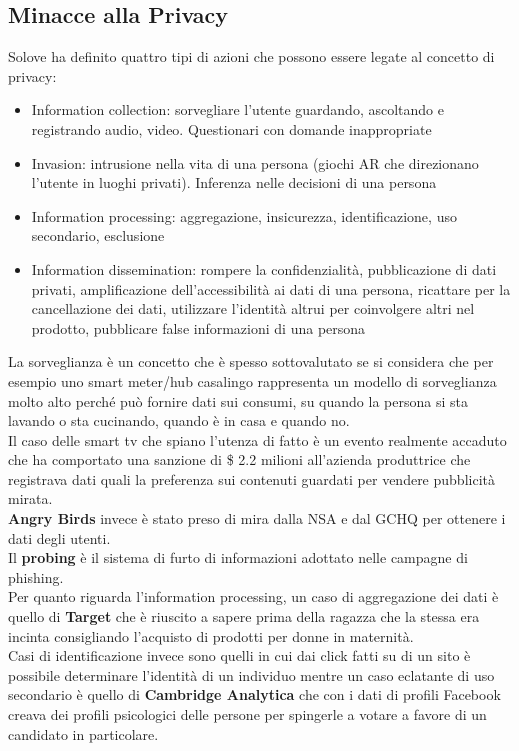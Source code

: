 \subsection{Minacce alla Privacy}
Solove ha definito quattro tipi di azioni che possono essere legate al concetto di privacy:
\begin{itemize}[noitemsep]
    \item Information collection: sorvegliare l'utente guardando, ascoltando e registrando audio, video. Questionari con domande inappropriate
    \item Invasion: intrusione nella vita di una persona (giochi AR che direzionano l'utente in luoghi privati). Inferenza nelle decisioni di una persona
    \item Information processing: aggregazione, insicurezza, identificazione, uso secondario, esclusione
    \item Information dissemination: rompere la confidenzialità, pubblicazione di dati privati, amplificazione dell'accessibilità ai dati di una persona, ricattare per la cancellazione dei dati, utilizzare l'identità altrui per coinvolgere altri nel prodotto, pubblicare false informazioni di una persona
\end{itemize}
La sorveglianza è un concetto che è spesso sottovalutato se si considera che per esempio uno smart meter/hub casalingo rappresenta un modello di sorveglianza molto alto perché può fornire dati sui consumi, su quando la persona si sta lavando o sta cucinando, quando è in casa e quando no.\\
Il caso delle smart tv che spiano l'utenza di fatto è un evento realmente accaduto che ha comportato una sanzione di \$ 2.2 milioni all'azienda produttrice che registrava dati quali la preferenza sui contenuti guardati per vendere pubblicità mirata.\\
\textbf{Angry Birds} invece è stato preso di mira dalla \acrfull{NSA} e dal \acrfull{GCHQ} per ottenere i dati degli utenti.\\
Il \textbf{probing} è il sistema di furto di informazioni adottato nelle campagne di phishing.\\
Per quanto riguarda l'information processing, un caso di aggregazione dei dati è quello di \textbf{Target} che è riuscito a sapere prima della ragazza che la stessa era incinta consigliando l'acquisto di prodotti per donne in maternità.\\
Casi di identificazione invece sono quelli in cui dai click fatti su di un sito è possibile determinare l'identità di un individuo mentre un caso eclatante di uso secondario è quello di \textbf{Cambridge Analytica} che con i dati di profili Facebook creava dei profili psicologici delle persone per spingerle a votare a favore di un candidato in particolare.\\
